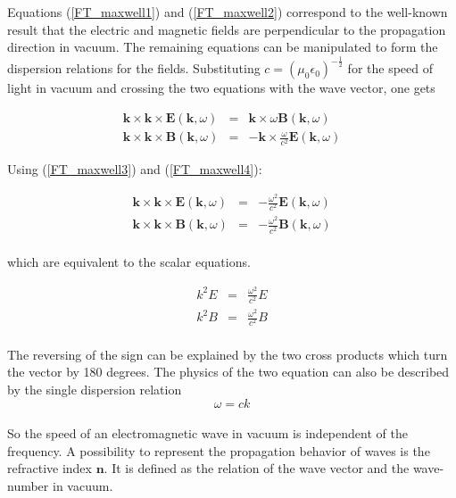 \documentclass[a4paper,11pt]{thesis}
\begin{document}
Equations (\ref{FT_maxwell1}) and (\ref{FT_maxwell2}) correspond to the well-known result that the
electric and magnetic fields are perpendicular to the propagation
direction in vacuum. The remaining equations can be manipulated to
form the dispersion relations for the fields. Substituting $c=(\mu_0
\epsilon_0)^{-\frac{1}{2}}$ for the speed of  light in vacuum and
crossing the two equations with the wave vector, one gets

\begin{eqnarray}
 \mathbf{k} \times \mathbf{k} \times \mathbf{E}(\mathbf{k},\omega)&=&  \mathbf{k} \times \omega  \mathbf{B}(\mathbf{k},\omega)
 \\
  \mathbf{k} \times \mathbf{k}  \times \mathbf{B}(\mathbf{k},\omega)&=& -  \mathbf{k} \times \frac{ \omega }{c^2}
  \mathbf{E}(\mathbf{k},\omega)
\end{eqnarray}

Using (\ref{FT_maxwell3}) and (\ref{FT_maxwell4}):

\begin{eqnarray}
 \mathbf{k} \times \mathbf{k} \times \mathbf{E}(\mathbf{k},\omega)&=&  - \frac{ \omega^2 }{c^2}  \mathbf{E}(\mathbf{k},\omega)  \\
  \mathbf{k} \times \mathbf{k}  \times \mathbf{B}(\mathbf{k},\omega)&=& -  \frac{ \omega^2 }{c^2} \mathbf{B}(\mathbf{k},\omega)
\end{eqnarray}\\

which are equivalent to the scalar equations.

\begin{eqnarray}
 k^2 E &=&   \frac{ \omega^2 }{c^2} E  \\
 k^2 B &=&   \frac{ \omega^2 }{c^2} B
\end{eqnarray}\\

The reversing of the sign can be explained by the two cross products which turn the vector by 180 degrees. The physics of the two equation can also be described by the single dispersion relation\\

\begin{equation}\label{dispersion_relation_vacuum}
    \omega = c k
\end{equation}\\

So the speed of an electromagnetic wave in vacuum is independent of the frequency. A possibility to represent the propagation behavior of waves is the refractive index $\mathbf{n}$. It is defined as the relation of the wave vector and the wave-number in vacuum.
\end{document}
